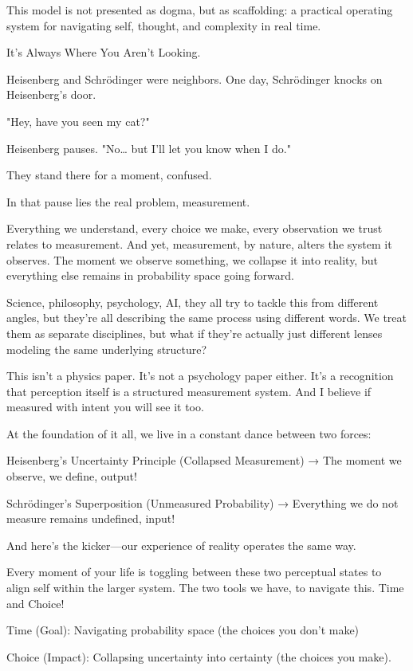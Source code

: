 \documentclass[12pt]{article}
\begin{document}
This model is not presented as dogma, but as scaffolding: a practical operating system for navigating self, thought, and complexity in real time.

It’s Always Where You Aren’t Looking.

Heisenberg and Schrödinger were neighbors. One day, Schrödinger knocks on Heisenberg’s door.

"Hey, have you seen my cat?"

Heisenberg pauses. "No… but I’ll let you know when I do."

They stand there for a moment, confused. 

In that pause lies the real problem, measurement. 

Everything we understand, every choice we make, every observation we trust relates to measurement. And yet, measurement, by nature, alters the system it observes. The moment we observe something, we collapse it into reality, but everything else remains in probability space going forward. 

Science, philosophy, psychology, AI, they all try to tackle this from different angles, but they’re all describing the same process using different words. We treat them as separate disciplines, but what if they’re actually just different lenses modeling the same underlying structure?

This isn’t a physics paper. It’s not a psychology paper either. It’s a recognition that perception itself is a structured measurement system. And I believe if measured with intent you will see it too. 

At the foundation of it all, we live in a constant dance between two forces:

Heisenberg’s Uncertainty Principle (Collapsed Measurement) → The moment we observe, we define, output!

Schrödinger’s Superposition (Unmeasured Probability) → Everything we do not measure remains undefined, input!

And here’s the kicker—our experience of reality operates the same way.

Every moment of your life is toggling between these two perceptual states to align self within the larger system. The two tools we have, to navigate this. Time and Choice!

Time (Goal): Navigating probability space (the choices you don’t make)

Choice (Impact): Collapsing uncertainty into certainty (the choices you make).
\end{document}
